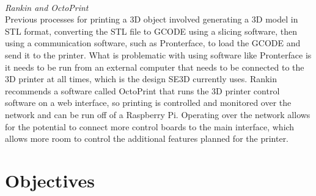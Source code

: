\\
\begin{adjustwidth}{2.5em}{0pt}

\textit{Rankin and OctoPrint}
\\
Previous processes for printing a 3D object involved generating a 3D model in STL format, converting the STL file to GCODE using a slicing software, then using a communication software, such as Pronterface, to load the GCODE and send it to the printer. What is problematic with using software like Pronterface is it needs to be run from an external computer that needs to be connected to the 3D printer at all times, which is the design SE3D currently uses. Rankin recommends a software called OctoPrint that runs the 3D printer control software on a web interface, so printing is controlled and monitored over the network and can be run off of a Raspberry Pi. Operating over the network allows for the potential to connect more control boards to the main interface, which allows more room to control the additional features planned for the printer.
\end{adjustwidth}

\section{Objectives}

